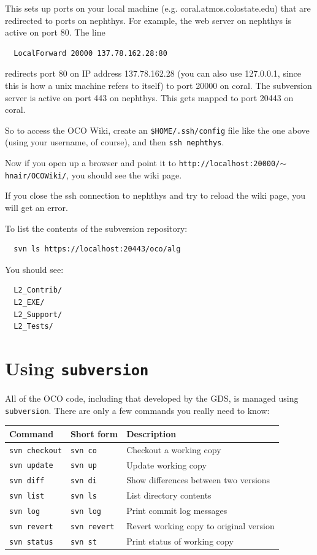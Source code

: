 \documentclass{article}
\begin{document}
This sets up ports on your local machine
(e.g. coral.atmos.colostate.edu) that are redirected to ports on
nephthys.  For example, the web server on nephthys is active on port
80.  The line

\begin{verbatim}
  LocalForward 20000 137.78.162.28:80
\end{verbatim}

redirects port 80 on IP address 137.78.162.28 (you can also use
127.0.0.1, since this is how a unix machine refers to itself) to port
20000 on coral.  The subversion server is active on port 443 on
nephthys.  This gets mapped to port 20443 on coral.

So to access the OCO Wiki, create an \texttt{\${HOME}/.ssh/config}
file like the one above (using your username, of course), and then
\texttt{ssh nephthys}.

Now if you open up a browser and point it to
\texttt{http://localhost:20000/$\sim$hnair/OCOWiki/}, you should see the
wiki page.

If you close the ssh connection to nephthys and try to reload the wiki
page, you will get an error.

To list the contents of the subversion repository:

\begin{verbatim}
  svn ls https://localhost:20443/oco/alg
\end{verbatim}

You should see:

\begin{verbatim}
  L2_Contrib/
  L2_EXE/
  L2_Support/
  L2_Tests/
\end{verbatim}

\section{Using \texttt{subversion}}

All of the OCO code, including that developed by the GDS, is managed
using \texttt{subversion}.  There are only a few commands you really
need to know:

\begin{tabular}{|l|l|l|}
\hline
Command & Short form & Description \\
\hline
\texttt{svn checkout} & \texttt{svn co} & Checkout a working copy\\
\texttt{svn update} & \texttt{svn up} & Update working copy\\
\hline
\texttt{svn diff} & \texttt{svn di} & Show differences between two versions\\
\texttt{svn list} & \texttt{svn ls} & List directory contents\\
\texttt{svn log} & \texttt{svn log} & Print commit log messages\\
\texttt{svn revert} & \texttt{svn revert} & Revert working copy to
original version\\
\texttt{svn status} & \texttt{svn st} & Print status of working copy\\
\hline
\end{tabular}
\end{document}
